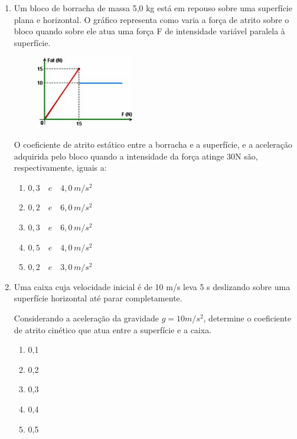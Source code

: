 \documentclass[12pt,letterpaper,fleqn]{article}
\begin{document}
\begin{itemize}
    \begin{enumerate}
        \item Um bloco de borracha de massa 5,0 kg está em repouso sobre uma superfície plana e horizontal. O gráfico representa como varia a força de atrito sobre o bloco quando sobre ele atua uma força F de intensidade variável paralela à superfície.
        
        \begin{figure}[h]
            \centering
            \includegraphics[width=0.4\textwidth]{ex_14.jpg}
        \end{figure}
        
        O coeficiente de atrito estático entre a borracha e a superfície, e a aceleração adquirida pelo bloco quando a intensidade da força atinge 30N são, respectivamente, iguais a:
        \begin{enumerate}
            \item $0,3\quad e \quad 4,0\, m/s^2$
            \item $0,2\quad e \quad 6,0\, m/s^2$
            \item $0,3\quad e \quad6,0\, m/s^2$
            \item $0,5\quad e \quad 4,0\, m/s^2$
            \item $0,2\quad e \quad3,0\, m/s^2$
        \end{enumerate}
        
        \item Uma caixa cuja velocidade inicial é de 10 m/s leva 5 s deslizando sobre uma superfície horizontal até parar completamente.

Considerando a aceleração da gravidade $g = 10 m/s^2$, determine o coeficiente de atrito cinético que atua entre a superfície e a caixa.

\begin{enumerate}
    \item 0,1 
    \item 0,2
    \item 0,3
    \item 0,4
    \item 0,5
\end{enumerate}


\end{enumerate}
\end{itemize}
\end{document}
